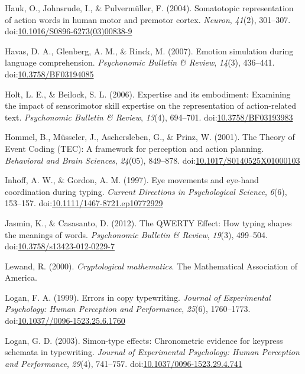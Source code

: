 \documentclass[english,man, mask]{apa6}
\theoremstyle{definition}
\theoremstyle{definition}
\theoremstyle{definition}
\theoremstyle{remark}
\begin{document}
\hypertarget{ref-Hauk2004}{}
Hauk, O., Johnsrude, I., \& Pulvermüller, F. (2004). Somatotopic
representation of action words in human motor and premotor cortex.
\emph{Neuron}, \emph{41}(2), 301--307.
doi:\href{https://doi.org/10.1016/S0896-6273(03)00838-9}{10.1016/S0896-6273(03)00838-9}

\hypertarget{ref-Havas2007}{}
Havas, D. A., Glenberg, A. M., \& Rinck, M. (2007). Emotion simulation
during language comprehension. \emph{Psychonomic Bulletin \& Review},
\emph{14}(3), 436--441.
doi:\href{https://doi.org/10.3758/BF03194085}{10.3758/BF03194085}

\hypertarget{ref-Holt2006}{}
Holt, L. E., \& Beilock, S. L. (2006). Expertise and its embodiment:
Examining the impact of sensorimotor skill expertise on the
representation of action-related text. \emph{Psychonomic Bulletin \&
Review}, \emph{13}(4), 694--701.
doi:\href{https://doi.org/10.3758/BF03193983}{10.3758/BF03193983}

\hypertarget{ref-Hommel2001}{}
Hommel, B., Müsseler, J., Aschersleben, G., \& Prinz, W. (2001). The
Theory of Event Coding (TEC): A framework for perception and action
planning. \emph{Behavioral and Brain Sciences}, \emph{24}(05), 849--878.
doi:\href{https://doi.org/10.1017/S0140525X01000103}{10.1017/S0140525X01000103}

\hypertarget{ref-Inhoff1997}{}
Inhoff, A. W., \& Gordon, A. M. (1997). Eye movements and eye-hand
coordination during typing. \emph{Current Directions in Psychological
Science}, \emph{6}(6), 153--157.
doi:\href{https://doi.org/10.1111/1467-8721.ep10772929}{10.1111/1467-8721.ep10772929}

\hypertarget{ref-Jasmin2012}{}
Jasmin, K., \& Casasanto, D. (2012). The QWERTY Effect: How typing
shapes the meanings of words. \emph{Psychonomic Bulletin \& Review},
\emph{19}(3), 499--504.
doi:\href{https://doi.org/10.3758/s13423-012-0229-7}{10.3758/s13423-012-0229-7}

\hypertarget{ref-Lewand2000}{}
Lewand, R. (2000). \emph{Cryptological mathematics}. The Mathematical
Association of America.

\hypertarget{ref-Logan1999}{}
Logan, F. A. (1999). Errors in copy typewriting. \emph{Journal of
Experimental Psychology: Human Perception and Performance},
\emph{25}(6), 1760--1773.
doi:\href{https://doi.org/10.1037//0096-1523.25.6.1760}{10.1037//0096-1523.25.6.1760}

\hypertarget{ref-Logan2003}{}
Logan, G. D. (2003). Simon-type effects: Chronometric evidence for
keypress schemata in typewriting. \emph{Journal of Experimental
Psychology: Human Perception and Performance}, \emph{29}(4), 741--757.
doi:\href{https://doi.org/10.1037/0096-1523.29.4.741}{10.1037/0096-1523.29.4.741}
\end{document}

